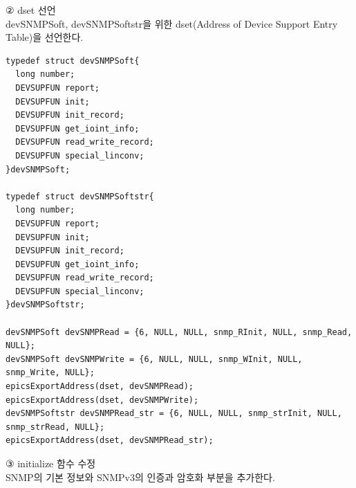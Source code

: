 \documentclass[11pt
  , a4paper
  , article
  , oneside
]{memoir}
\begin{document}
\hfill

② dset 선언\\
devSNMPSoft, devSNMPSoftstr을 위한 dset(Address of Device Support Entry Table)을 선언한다.

{\scriptsize
\begin{lstlisting}[style=termstyle]
typedef struct devSNMPSoft{
  long number;
  DEVSUPFUN report;
  DEVSUPFUN init;
  DEVSUPFUN init_record;
  DEVSUPFUN get_ioint_info;
  DEVSUPFUN read_write_record;
  DEVSUPFUN special_linconv;
}devSNMPSoft;

typedef struct devSNMPSoftstr{
  long number;
  DEVSUPFUN report;
  DEVSUPFUN init;
  DEVSUPFUN init_record;
  DEVSUPFUN get_ioint_info;
  DEVSUPFUN read_write_record;
  DEVSUPFUN special_linconv;
}devSNMPSoftstr;

devSNMPSoft devSNMPRead = {6, NULL, NULL, snmp_RInit, NULL, snmp_Read, NULL};
devSNMPSoft devSNMPWrite = {6, NULL, NULL, snmp_WInit, NULL, snmp_Write, NULL};
epicsExportAddress(dset, devSNMPRead);
epicsExportAddress(dset, devSNMPWrite);
devSNMPSoftstr devSNMPRead_str = {6, NULL, NULL, snmp_strInit, NULL, snmp_strRead, NULL};
epicsExportAddress(dset, devSNMPRead_str);
\end{lstlisting}
}

\hfill

③ initialize 함수 수정\\
SNMP의 기본 정보와 SNMPv3의 인증과 암호화 부분을 추가한다.
\end{document}
